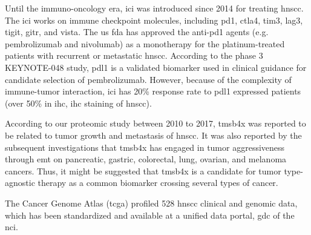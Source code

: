 \documentclass[jpm,article,submit,moreauthors,pdftex]{Definitions/mdpi}
\newenvironment{MyColorPar}[1]{%
    \leavevmode\color{#1}\ignorespaces%
}{%
}%
\begin{document}
Until the immuno-oncology era, \acrfull{ici} was introduced since 2014 for treating \acrshort{hnscc}\cite{Seiwert2014}\cite{Swanson2015}.
The \acrshort{ici} works on immune checkpoint molecules, including \acrfull{pd1}, \acrfull{ctla4}, \acrfull{tim3}, \acrfull{lag3}, \acrfull{tigit}, \acrfull{gitr}, and \acrfull{vista}\cite{Mei2020}.
The \acrshort{us} \acrshort{fda} has approved the anti-\acrshort{pd1} agents (e.g. pembrolizumab and nivolumab) as a monotherapy for the platinum-treated patients with recurrent or metastatic \acrshort{hnscc}\cite{Cramer2019}. 
According to the phase 3 KEYNOTE-048 study, \acrshort{pdl1} is a validated biomarker used in clinical guidance for candidate selection of pembrolizumab\cite{Burtness2019}\cite{Gavrielatou2020}.
However, because of the complexity of immune-tumor interaction, \acrshort{ici} has 20\% response rate to \acrfull{pdl1} expressed patients (over 50\% in \acrlong{ihc}, \acrshort{ihc} staining of \acrshort{hnscc})\cite{Swanson2015}\cite{Gavrielatou2020}.

According to our proteomic study between 2010 to 2017, \acrfull{tmsb4x} was reported to be related to tumor growth and metastasis of \acrshort{hnscc}\cite{Chi2017}. It was also reported by the subsequent investigations that \acrshort{tmsb4x} has engaged in tumor aggressiveness through \acrfull{emt} on pancreatic\cite{Zhang2008}, gastric\cite{Ryu2012}, colorectal\cite{Gemoll2015}, lung\cite{Huang2016}, ovarian\cite{Chu2019}, and melanoma\cite{Makowiecka2019} cancers. Thus, it might be suggested that \acrshort{tmsb4x}  is a candidate for tumor type-agnostic therapy\cite{Yan2018} as a common biomarker crossing several types of cancer.

\begin{MyColorPar}{red}
The Cancer Genome Atlas (\acrshort{tcga}) profiled 528 \acrshort{hnscc} clinical and genomic data, which has been standardized and available at a unified data portal, \acrfull{gdc} of the \acrfull{nci}.
\end{MyColorPar}
\end{document}
